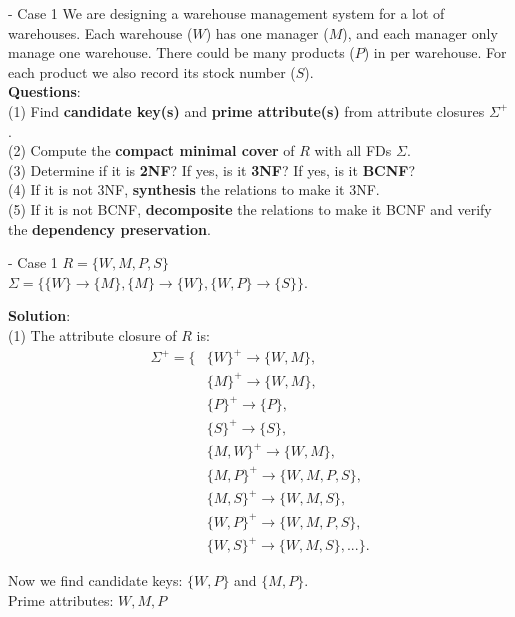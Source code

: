 \begin{frame}[fragile]{ - Case 1}
We are designing a warehouse management system for a lot of warehouses. Each warehouse ($W$) has one manager ($M$), and each manager only manage one warehouse. There could be many products ($P$) in per warehouse. For each product we also record its stock number ($S$).\\\vspace{10pt}
\textbf{Questions}:\\
(1) Find \textbf{candidate key(s)} and \textbf{prime attribute(s)} from attribute closures $\Sigma^{+}$.\\
(2) Compute the \textbf{compact minimal cover} of $R$ with all FDs $\Sigma$.\\
(3) Determine if it is \textbf{2NF}? If yes, is it \textbf{3NF}? If yes, is it \textbf{BCNF}?\\
(4) If it is not 3NF, \textbf{synthesis} the relations to make it 3NF.\\
(5) If it is not BCNF, \textbf{decomposite} the relations to make it BCNF and verify the \textbf{dependency preservation}. 
\end{frame}

\begin{frame}[fragile]{ - Case 1}
	$R = \{W, M, P, S\}$\\
	$\Sigma = \{\{W\} \rightarrow \{M\}, \{M\} \rightarrow \{W\},
	\{W, P\} \rightarrow \{S\}\}$.\\\vspace{5pt}
	
	\textbf{Solution}:\\
	(1) The attribute closure of $R$ is:
	\begin{align*} 
	\Sigma^{+} = \{&\{W\}^{+} \rightarrow \{W, M\},\\
	&\{M\}^{+} \rightarrow \{W, M\},\\
	&\{P\}^{+} \rightarrow \{P\},\\
	&\{S\}^{+} \rightarrow \{S\},\\
	&\{{M,W}\}^{+} \rightarrow \{W, M\},\\
	&\{{M,P}\}^{+} \rightarrow \{W, M, P, S\},\\
	&\{{M,S}\}^{+} \rightarrow \{W, M, S\},\\
	&\{{W,P}\}^{+} \rightarrow \{W, M, P, S\},\\
	&\{{W,S}\}^{+} \rightarrow \{W, M, S\},...\}.
	\end{align*} 

	Now we find candidate keys: $\{W, P\}$ and $\{M, P\}$.\\
	Prime attributes: $W, M, P$
\end{frame}


